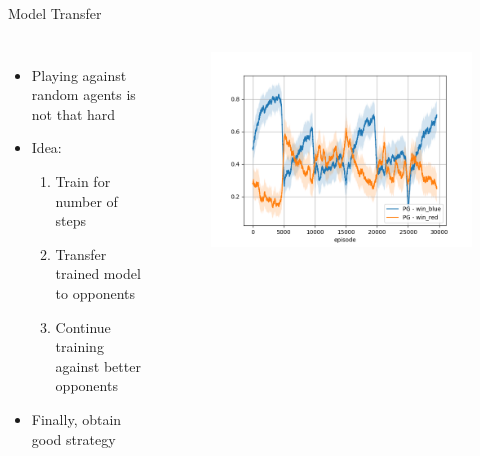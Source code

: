 \documentclass{beamer}
\begin{document}
\begin{frame}{Model Transfer}
\begin{columns}

\begin{itemize}
    \item Playing against random agents is not that hard
    \item Idea:
        \begin{enumerate}
            \item Train for number of steps
            \item Transfer trained model to opponents
            \item Continue training against better opponents
        \end{enumerate}
    \item Finally, obtain good strategy
\end{itemize}

\begin{figure}[htp]
    \centering
    \includegraphics[width=\textwidth]{images/iteration/iterative.png}
\end{figure}

\end{columns}
\end{frame}
\end{document}
